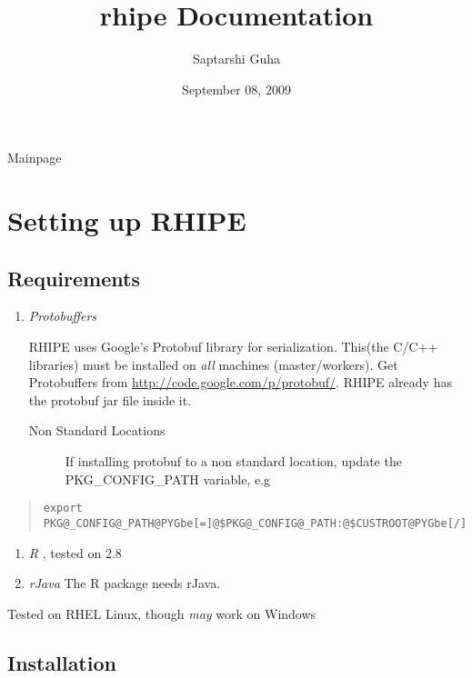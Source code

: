 \documentclass[letterpaper,10pt,english]{manual}
\title{rhipe Documentation}
\date{September 08, 2009}
\author{Saptarshi Guha}
\begin{document}
\maketitle
\tableofcontents



Mainpage

\resetcurrentobjects
\hypertarget{--doc-installation}{}

\chapter{Setting up RHIPE}


\section{Requirements}
\begin{enumerate}
\item {} 
\emph{Protobuffers}

RHIPE uses Google's Protobuf library for serialization. This(the C/C++
libraries) must be installed on \emph{all} machines (master/workers). Get
Protobuffers from \href{http://code.google.com/p/protobuf/}{http://code.google.com/p/protobuf/}. RHIPE already has the
protobuf jar file inside it.
\begin{description}
\item[Non Standard Locations]
If installing protobuf to a non standard location, update the
PKG\_CONFIG\_PATH variable, e.g

\end{description}

\end{enumerate}
\begin{quote}

\begin{Verbatim}[commandchars=@\[\]]
export PKG@_CONFIG@_PATH@PYGbe[=]@$PKG@_CONFIG@_PATH:@$CUSTROOT@PYGbe[/]lib@PYGbe[/]pkgconfig@PYGbe[/]
\end{Verbatim}
\end{quote}
\begin{enumerate}
\item {} 
\emph{R} , tested on 2.8

\item {} 
\emph{rJava} The R package needs rJava.

\end{enumerate}

Tested on RHEL Linux, though \emph{may} work on Windows


\section{Installation}
\end{document}
